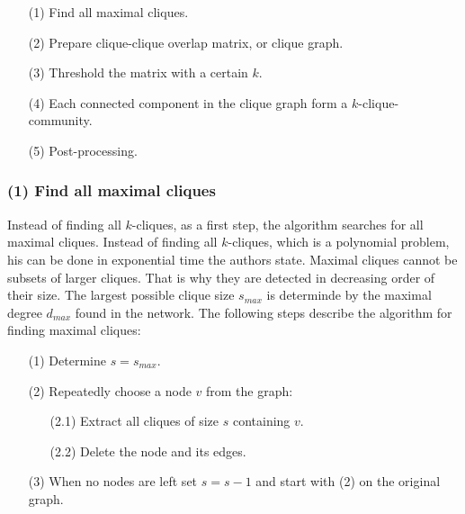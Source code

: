 \documentclass[runningheads,a4paper]{llncs}
\begin{document}
\noindent
\colorbox{usethiscolorhere}{
\begin{minipage}{\dimexpr\textwidth-2\fboxsep}

\begin{enumerate}
\small
\item[(1)] Find all maximal cliques.
\item[(2)] Prepare clique-clique overlap matrix, or clique graph.
\item[(3)] Threshold the matrix with a certain $k$.
\item[(4)] Each connected component in the clique graph form a $k$-clique-community.
\item[(5)] Post-processing.
\end{enumerate}

\end{minipage}
}

\subsubsection{(1) Find all maximal cliques}
Instead of finding all $k$-cliques, as a first step, the algorithm searches for all maximal cliques. Instead of finding all $k$-cliques, which is a polynomial problem, his can be done in exponential time the authors state.
Maximal cliques cannot be subsets of larger cliques.
That is why they are detected in decreasing order of their size.
The largest possible clique size $s_{max}$ is determinde by the maximal degree $d_{max}$ found in the network. The following steps describe the algorithm for finding maximal cliques:

\medskip

\noindent
\colorbox{usethiscolorhere}{
\begin{minipage}{\dimexpr\textwidth-2\fboxsep}

\begin{enumerate}
\small
\item[(1)] Determine $s=s_{max}$.
\item[(2)] Repeatedly choose a node $v$ from the graph:
	\begin{enumerate}
		\item[(2.1)] Extract all cliques of size $s$ containing $v$.
		\item[(2.2)] Delete the node and its edges.
	\end{enumerate}
\item[(3)] When no nodes are left set $s=s-1$ and start with (2) on the original graph.
\end{enumerate}

\end{minipage}
}
\end{document}
